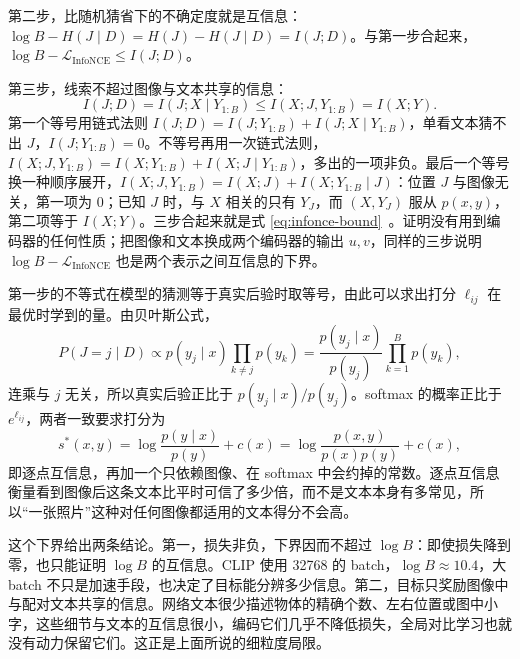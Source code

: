第二步，比随机猜省下的不确定度就是互信息：\(\log B-H(J\mid D)=H(J)-H(J\mid D)=I(J;D)\)。与第一步合起来，\(\log B-\mathcal L_{\mathrm{InfoNCE}}\le I(J;D)\)。

第三步，线索不超过图像与文本共享的信息：
\begin{equation}
 I(J;D)=I(J;X\mid Y_{1:B})\le I(X;J,Y_{1:B})=I(X;Y).
\end{equation}
第一个等号用链式法则 \(I(J;D)=I(J;Y_{1:B})+I(J;X\mid Y_{1:B})\)，单看文本猜不出 \(J\)，\(I(J;Y_{1:B})=0\)。不等号再用一次链式法则，\(I(X;J,Y_{1:B})=I(X;Y_{1:B})+I(X;J\mid Y_{1:B})\)，多出的一项非负。最后一个等号换一种顺序展开，\(I(X;J,Y_{1:B})=I(X;J)+I(X;Y_{1:B}\mid J)\)：位置 \(J\) 与图像无关，第一项为 0；已知 \(J\) 时，与 \(X\) 相关的只有 \(Y_J\)，而 \((X,Y_J)\) 服从 \(p(x,y)\)，第二项等于 \(I(X;Y)\)。三步合起来就是式 \eqref{eq:infonce-bound}~\cite{poole2019variational}。证明没有用到编码器的任何性质；把图像和文本换成两个编码器的输出 \(u,v\)，同样的三步说明 \(\log B-\mathcal L_{\mathrm{InfoNCE}}\) 也是两个表示之间互信息的下界。

第一步的不等式在模型的猜测等于真实后验时取等号，由此可以求出打分 \(\ell_{ij}\) 在最优时学到的量。由贝叶斯公式，
\begin{equation}
 P(J=j\mid D)\propto p(y_j\mid x)\prod_{k\neq j}p(y_k)
 =\frac{p(y_j\mid x)}{p(y_j)}\prod_{k=1}^{B}p(y_k),
\end{equation}
连乘与 \(j\) 无关，所以真实后验正比于 \(p(y_j\mid x)/p(y_j)\)。softmax 的概率正比于 \(e^{\ell_{ij}}\)，两者一致要求打分为
\begin{equation}
 s^*(x,y)=\log\frac{p(y\mid x)}{p(y)}+c(x)=\log\frac{p(x,y)}{p(x)p(y)}+c(x),
\end{equation}
即逐点互信息，再加一个只依赖图像、在 softmax 中会约掉的常数。逐点互信息衡量看到图像后这条文本比平时可信了多少倍，而不是文本本身有多常见，所以“一张照片”这种对任何图像都适用的文本得分不会高。

这个下界给出两条结论。第一，损失非负，下界因而不超过 \(\log B\)：即使损失降到零，也只能证明 \(\log B\) 的互信息。CLIP 使用 32768 的 batch，\(\log B\approx10.4\)，大 batch 不只是加速手段，也决定了目标能分辨多少信息。第二，目标只奖励图像中与配对文本共享的信息。网络文本很少描述物体的精确个数、左右位置或图中小字，这些细节与文本的互信息很小，编码它们几乎不降低损失，全局对比学习也就没有动力保留它们。这正是上面所说的细粒度局限。


